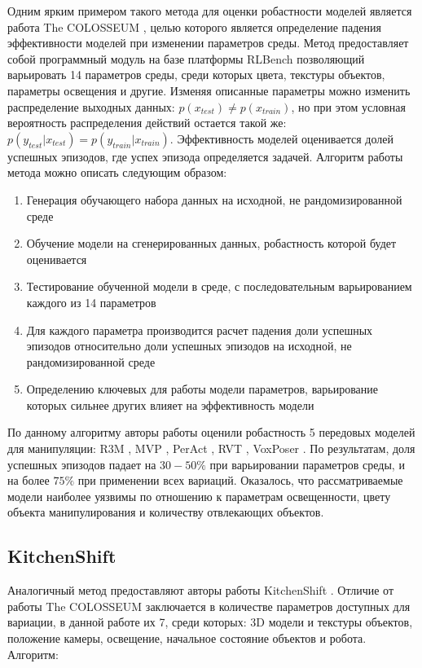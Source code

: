         Одним ярким примером такого метода для оценки робастности моделей является работа The COLOSSEUM \cite{pumacay2024colosseum}, целью которого является определение падения эффективности моделей при изменении параметров среды. Метод предоставляет собой программный модуль на базе платформы RLBench \cite{james2020rlbench} позволяющий варьировать 14 параметров среды, среди которых цвета, текстуры объектов, параметры освещения и другие. Изменяя описанные параметры можно изменить распределение выходных данных: $p(x_{test}) \neq p(x_{train})$, но при этом условная вероятность распределения действий остается такой же: $p(y_{test} | x_{test}) = p(y_{train} | x_{train})$. Эффективность моделей оценивается долей успешных эпизодов, где успех эпизода определяется задачей. Алгоритм работы метода можно описать следующим образом:
    
        \begin{enumerate}
            \item Генерация обучающего набора данных на исходной, не рандомизированной среде
            \item Обучение модели на сгенерированных данных, робастность которой будет оценивается
            \item Тестирование обученной модели в среде, с последовательным варьированием каждого из 14 параметров 
            \item Для каждого параметра производится расчет падения доли успешных эпизодов относительно доли успешных эпизодов на исходной, не рандомизированной среде
            \item Определению ключевых для работы модели параметров, варьирование которых сильнее других влияет на эффективность модели
        \end{enumerate}
    
        По данному алгоритму авторы работы оценили робастность 5 передовых моделей для манипуляции: R3M \cite{nair2022r3m}, MVP \cite{Radosavovic2022}, PerAct \cite{shridhar2022peract}, RVT \cite{goyal2023rvt}, VoxPoser \cite{huang2023voxposer}. По результатам, доля успешных эпизодов падает на $30-50\%$ при варьировании параметров среды, и на более $75\%$ при применении всех вариаций. Оказалось, что рассматриваемые модели наиболее уязвимы по отношению к параметрам освещенности, цвету объекта манипулирования и количеству отвлекающих объектов. 
    
        \subsection{KitchenShift}
            Аналогичный метод предоставляют авторы работы KitchenShift \cite{xing2021kitchenshift}. Отличие от работы The COLOSSEUM заключается в количестве параметров доступных для вариации, в данной работе их 7, среди которых: 3D модели и текстуры объектов, положение камеры, освещение, начальное состояние объектов и робота. Алгоритм:
    
